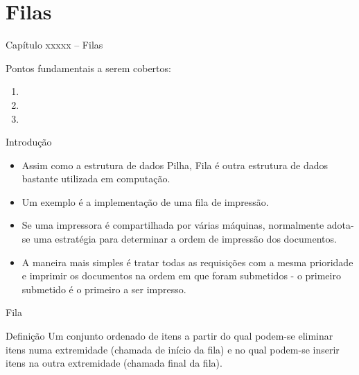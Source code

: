 
\section{Filas}


\begin{frame}
\begin{center}
{\Large Capítulo xxxxx -- Filas}

Pontos fundamentais a serem cobertos:

\begin{enumerate}
  \item 
  \item 
  \item 
\end{enumerate}

\end{center}

\end{frame}



  \begin{frame}{Introdução}    
		\begin{itemize}
			\item Assim como a estrutura de dados Pilha, Fila é outra estrutura de dados bastante utilizada em computação.
			\item Um exemplo é a implementação de uma fila de impressão.
			\item Se uma impressora é compartilhada por várias máquinas, normalmente adota-se uma estratégia para determinar a ordem de impressão dos documentos.
			\item A maneira mais simples é tratar todas as requisições com a mesma prioridade e imprimir os documentos na ordem em que foram submetidos - o primeiro submetido é o primeiro a ser impresso.
		\end{itemize}
  \end{frame}
  
\begin{frame}{Fila}
     \begin{block}{Definição}
       Um conjunto ordenado de itens a partir do qual podem-se eliminar itens numa extremidade (chamada de \alert{início} da fila) e no qual podem-se inserir itens na outra extremidade (chamada \alert{final} da fila).
     \end{block}          
\end{frame}

